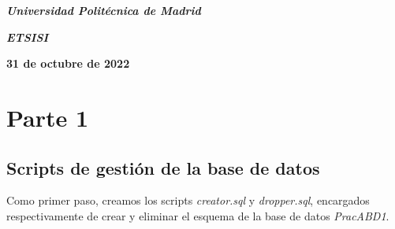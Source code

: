 \documentclass[a4paper, 11pt, oneside]{article} %
\newcommand{\plogo}{\fbox{$\mathcal{LCDPM}$}} %
\begin{document}
\begin{titlepage}
	\vspace{1.0\baselineskip} %
	
	\textit{\textbf{Universidad Politécnica de Madrid \\}} %

	\vspace{0.25\baselineskip} %

	\textit{\textbf{ETSISI}} %
	
	\vfill %
	
	
	\textbf{31 de octubre de 2022} %
	
	\vspace{0.5\baselineskip} %

	\plogo %

\end{titlepage}


\renewcommand*\contentsname{Índice} %

\setcounter{tocdepth}{3} %

\tableofcontents %

\newpage

	
\section{Parte 1}




\subsection{Scripts de gestión de la base de datos}

Como primer paso, creamos los scripts \emph{creator.sql} y \emph{dropper.sql}, encargados respectivamente de crear y eliminar el esquema de la base de datos \emph{PracABD1}.\\
\end{document}
